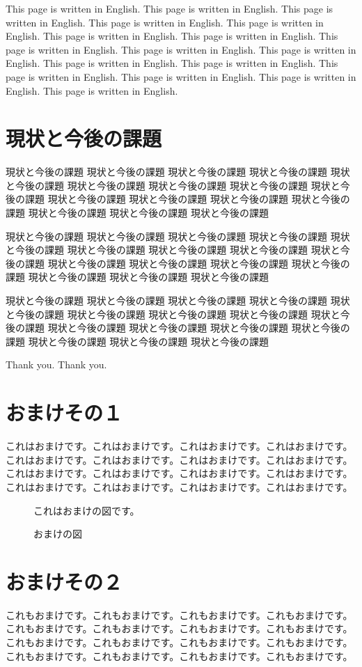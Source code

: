 \documentclass[12pt]{article} %
\begin{document}
This page is written in English. This page is written in English. 
This page is written in English. This page is written in English. 
This page is written in English. This page is written in English. 
This page is written in English. This page is written in English. 
This page is written in English. This page is written in English. 
This page is written in English. This page is written in English. 
This page is written in English. This page is written in English. 
This page is written in English. This page is written in English. 


\newpage
\section{現状と今後の課題}
\label{kadai}

現状と今後の課題 現状と今後の課題 現状と今後の課題 現状と今後の課題 
現状と今後の課題 現状と今後の課題 現状と今後の課題 現状と今後の課題 
現状と今後の課題 現状と今後の課題 現状と今後の課題 現状と今後の課題 
現状と今後の課題 現状と今後の課題 現状と今後の課題 現状と今後の課題 

現状と今後の課題 現状と今後の課題 現状と今後の課題 現状と今後の課題 
現状と今後の課題 現状と今後の課題 現状と今後の課題 現状と今後の課題 
現状と今後の課題 現状と今後の課題 現状と今後の課題 現状と今後の課題 
現状と今後の課題 現状と今後の課題 現状と今後の課題 現状と今後の課題 

現状と今後の課題 現状と今後の課題 現状と今後の課題 現状と今後の課題 
現状と今後の課題 現状と今後の課題 現状と今後の課題 現状と今後の課題 
現状と今後の課題 現状と今後の課題 現状と今後の課題 現状と今後の課題 
現状と今後の課題 現状と今後の課題 現状と今後の課題 現状と今後の課題 

%
%
\acknowledgements

Thank you. Thank you.
%
%
\newpage


%
%
\appendix

\section{おまけその１}
\label{omake1}

これはおまけです。これはおまけです。これはおまけです。これはおまけです。
これはおまけです。これはおまけです。これはおまけです。これはおまけです。
これはおまけです。これはおまけです。これはおまけです。これはおまけです。
これはおまけです。これはおまけです。これはおまけです。これはおまけです。

\begin{figure}
\centerline{これはおまけの図です。}
\caption{おまけの図}
\end{figure}


\section{おまけその２}

これもおまけです。これもおまけです。これもおまけです。これもおまけです。
これもおまけです。これもおまけです。これもおまけです。これもおまけです。
これもおまけです。これもおまけです。これもおまけです。これもおまけです。
これもおまけです。これもおまけです。これもおまけです。これもおまけです。
\end{document}
